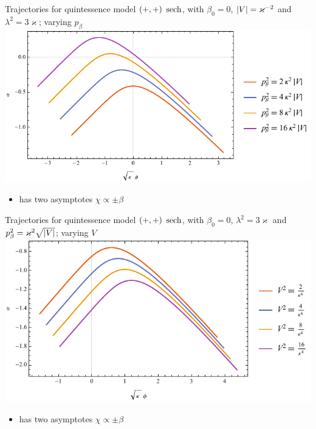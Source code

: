 \documentclass[9pt]{beamer}
\begin{document}
\begin{frame}%
{Trajectories for quintessence model ${\left(+,+\right)}$}%
{$\operatorname{sech}$, with $\beta_0 = 0$, ${\left|V\right|} = \varkappa^{-2}$ and
$\lambda^2 = 3\varkappa$; varying $p_\beta$}
\includegraphics[width=\textwidth]{../plots.nb/sech_pbet.pdf}
\begin{itemize}
	\item has two asymptotes $\chi \propto \pm \beta$
\end{itemize}
\end{frame}

\begin{frame}%
{Trajectories for quintessence model ${\left(+,+\right)}$}%
{$\operatorname{sech}$, with $\beta_0 = 0$, $\lambda^2 = 3\varkappa$ and
$p_\beta^2 = \varkappa^2\sqrt{{\left|V\right|}}$; varying $V$}
\includegraphics[width=\textwidth]{../plots.nb/sech_Vsqr.pdf}
\begin{itemize}
	\item has two asymptotes $\chi \propto \pm \beta$
\end{itemize}
\end{frame}

\end{document}
